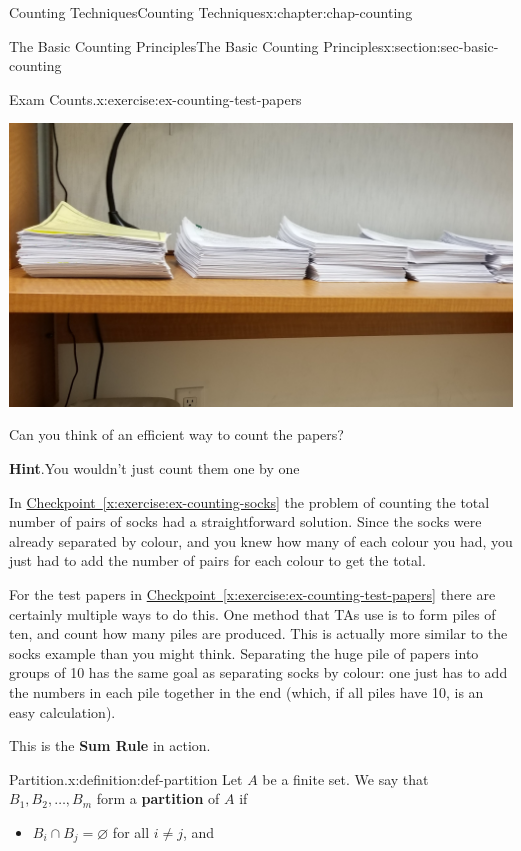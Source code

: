 \documentclass[oneside,10pt,]{book}
\newcommand{\blocktitlefont}{\relax}
\newcommand{\xreffont}{\relax}
\newcommand{\terminology}[1]{\textbf{#1}}
\numberwithin{equation}{section}
\begin{document}
\begin{chapterptx}{Counting Techniques}{}{Counting Techniques}{}{}{x:chapter:chap-counting}
\begin{sectionptx}{The Basic Counting Principles}{}{The Basic Counting Principles}{}{}{x:section:sec-basic-counting}
\begin{inlineexercise}{Exam Counts.}{x:exercise:ex-counting-test-papers}
\begin{sidebyside}{1}{0.25}{0.25}{0}
\begin{sbspanel}{0.5}
\includegraphics[width=\linewidth]{figs/test-papers.jpg}
\end{sbspanel}%
\end{sidebyside}%
\par
Can you think of an efficient way to count the papers?%
\par\smallskip%
\noindent\textbf{\blocktitlefont Hint}.\hypertarget{g:hint:id441468}{}\quad{}You wouldn't just count them one by one\textellipsis{}%
\end{inlineexercise}
In \hyperref[x:exercise:ex-counting-socks]{Checkpoint~{\xreffont\ref{x:exercise:ex-counting-socks}}} the problem of counting the total number of pairs of socks had a straightforward solution. Since the socks were already separated by colour, and you knew how many of each colour you had, you just had to add the number of pairs for each colour to get the total.%
\par
For the test papers in \hyperref[x:exercise:ex-counting-test-papers]{Checkpoint~{\xreffont\ref{x:exercise:ex-counting-test-papers}}} there are certainly multiple ways to do this. One method that TAs use is to form piles of ten, and count how many piles are produced. This is actually more similar to the socks example than you might think. Separating the huge pile of papers into groups of 10 has the same goal as separating socks by colour: one just has to add the numbers in each pile together in the end (which, if all piles have 10, is an easy calculation).%
\par
This is the \terminology{Sum Rule} in action.%
\begin{definition}{Partition.}{x:definition:def-partition}%
Let \(A\) be a finite set. We say that \(B_1,B_2,\ldots,B_m\) form a \terminology{partition} of \(A\) if%
\begin{itemize}[label=\textbullet]
\item{}\(B_i \cap B_j = \varnothing\) for all \(i \ne j\), and%

\end{itemize}
\end{definition}
\end{sectionptx}
\end{chapterptx}
\end{document}
